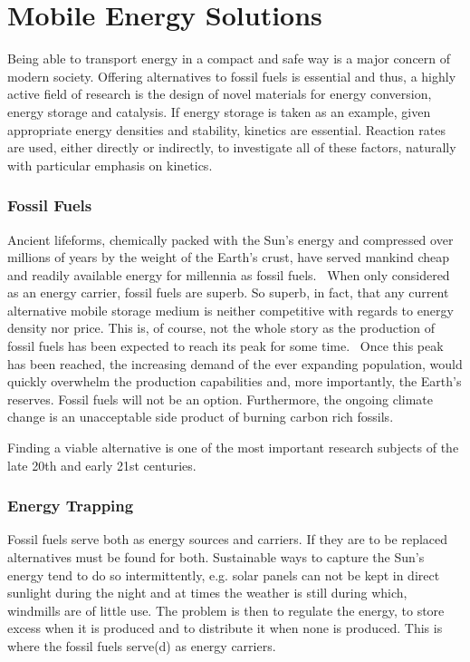 \section{Mobile Energy Solutions}
Being able to transport energy in a compact and safe way is a major concern of modern society.
Offering alternatives to fossil fuels is essential and thus, a highly active field of research is the design of novel materials for energy conversion, energy storage and catalysis.
If energy storage is taken as an example, given appropriate energy densities and stability, kinetics are essential.
Reaction rates are used, either directly or indirectly, to investigate all of these factors, naturally with particular emphasis on kinetics.

\subsubsection{Fossil Fuels}
Ancient lifeforms, chemically packed with the Sun's energy and compressed over millions of years by the weight of the Earth's crust, have served mankind cheap and readily available energy for millennia as fossil fuels.~\cite{early-oil-use}
When only considered as an energy carrier, fossil fuels are superb.
So superb, in fact, that any current alternative mobile storage medium is neither competitive with regards to energy density nor price.
This is, of course, not the whole story as the production of fossil fuels has been expected to reach its peak for some time.~\cite{peak-oil-1956}
Once this peak has been reached, the increasing demand of the ever expanding population, would quickly overwhelm the production capabilities and, more importantly, the Earth's reserves.
Fossil fuels will not be an option.
Furthermore, the ongoing climate change is an unacceptable side product of burning carbon rich fossils.~\cite{climate-change-2007}

Finding a viable alternative is one of the most important research subjects of the late 20th and early 21st centuries.

\subsubsection{Energy Trapping}
Fossil fuels serve both as energy sources and carriers.
If they are to be replaced alternatives must be found for both.
Sustainable ways to capture the Sun's energy tend to do so intermittently, e.g. solar panels can not be kept in direct sunlight during the night and at times the weather is still during which, windmills are of little use.
The problem is then to regulate the energy, to store excess when it is produced and to distribute it when none is produced.
This is where the fossil fuels serve(d) as energy carriers.

